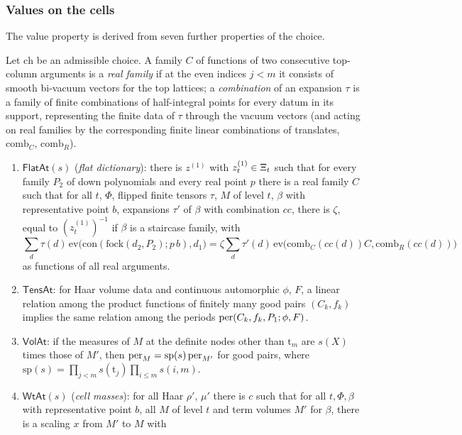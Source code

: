 \subsubsection{Values on the cells}
The value property is derived from seven further properties of the choice.

\begin{definition}\label{def:pf:rowprops:valprops}
Let $\mathrm{ch}$ be an admissible choice. A family $C$ of functions of two consecutive top-column arguments is a
\emph{real family} if at the even indices $j<m$ it consists of smooth bi-vacuum vectors for the top lattices; a
\emph{combination} of an expansion $\tau$ is a family of finite combinations of half-integral points for every datum in its
support, representing the finite data of $\tau$ through the vacuum vectors (and acting on real families by the
corresponding finite linear combinations of translates, $\mathrm{comb}_C$, $\mathrm{comb}_R$).
\begin{enumerate}[label=(\alph*)]
\item $\mathsf{FlatAt}(s)$ (\emph{flat dictionary}): there is $z^{(1)}$ with $z^{(1)}_t\in\Xi_t$ such that for every
family $P_2$ of down polynomials and every real point $p$ there is a real family $C$ such that for all $t$, $\Phi$, flipped
finite tensors $\tau$, $M$ of level $t$, $\beta$ with representative point $b$, expansions $\tau'$ of $\beta$ with
combination $cc$, there is $\zeta$, equal to $(z^{(1)}_t)^{-1}$ if $\beta$ is a staircase family, with
\[
\sum_d\tau(d)\,\mathrm{ev}\bigl(\mathrm{con}(\mathrm{fock}(d_2,P_2);p\,b),d_1\bigr)=\zeta\sum_d\tau'(d)\,
\mathrm{ev}\bigl(\mathrm{comb}_C(cc(d))C,\mathrm{comb}_R(cc(d))\bigr)
\]
as functions of all real arguments.
\item $\mathsf{TensAt}$: for Haar volume data and continuous automorphic $\phi$, $F$, a linear relation among the product
functions of finitely many good pairs $(C_k,f_k)$ implies the same relation among the periods
$\mathrm{per}(C_k,f_k,P_1;\phi,F)$.
\item $\mathsf{VolAt}$: if the measures of $M$ at the definite nodes other than $\mathrm t_m$ are $s(X)$ times those of $M'$,
then $\mathrm{per}_M=\mathrm{sp}(s)\,\mathrm{per}_{M'}$ for good pairs, where
$\mathrm{sp}(s)=\prod_{j<m}s(\mathrm t_j)\prod_{i\le m}s(i,m)$.
\item $\mathsf{WtAt}(s)$ (\emph{cell masses}): for all Haar $\rho'$, $\mu'$ there is $c$ such that for all $t,\Phi,\beta$ with
representative point $b$, all $M$ of level $t$ and term volumes $M'$ for $\beta$, there is a scaling $x$ from $M'$ to $M$ with

\end{enumerate}
\end{definition}
